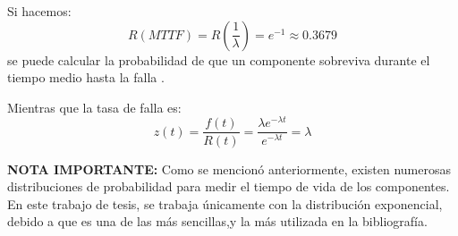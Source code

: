 Si hacemos: $$R(MTTF) = R(\frac{1}{\lambda}) = e^{-1}\approx 0.3679$$  se puede calcular la probabilidad de que un componente sobreviva durante el
tiempo medio hasta la falla \citep{Rausand04}.

Mientras que la tasa de falla es: $$z(t) = \frac{f(t)}{R(t)} = \frac{\lambda e^{-\lambda t}}{e^{-\lambda t}} = \lambda $$

\textbf{NOTA IMPORTANTE:} Como se mencionó anteriormente, existen numerosas distribuciones de probabilidad para medir el tiempo de vida de los componentes. En este trabajo de tesis, se trabaja únicamente con la distribución exponencial, debido a que es una de las más sencillas,y la más utilizada en la bibliografía.
